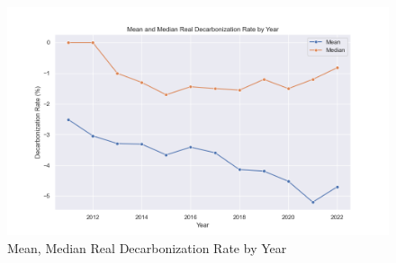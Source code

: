 \begin{figure}[H]
    \begin{center}
    \includegraphics[width=5in]{figures/mean_decarbonization_rate_year.png}
    \caption{Mean, Median Real Decarbonization Rate by Year}
    \label{fig:mean-decarbonization-rate-by-year}
    \end{center}
\end{figure}




